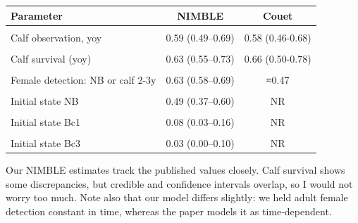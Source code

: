 \documentclass[
  12pt,
]{krantz}
\begin{document}
\begin{table}
\centering
\caption{\label{tab:dolphin}Age-specific estimates of breeding probabilities. Comparison of our NIMBLE estimates with Couet et al. (2019). 'NR' denotes quantities not reported in the paper. 'NB' is for non-breeding and 'yoy' for young-of-the-year. Adult female detection on the paper side is a rough time-average read by eye from the authors' Figure 3 (2005–2016).}
\centering
\begin{longtable}{lcc}
\toprule
Parameter & NIMBLE & Couet\\
\midrule
\cellcolor{gray!10}{Adult female survival} & \cellcolor{gray!10}{0.96 (0.94–0.98)} & \cellcolor{gray!10}{0.97 (0.96-0.98)}\\
Calf observation, yoy & 0.59 (0.49–0.69) & 0.58 (0.46-0.68)\\
\cellcolor{gray!10}{Calf observation, 1-3y} & \cellcolor{gray!10}{0.80 (0.70–0.89)} & \cellcolor{gray!10}{0.79 (0.59-0.90)}\\
Calf survival (yoy) & 0.63 (0.55–0.73) & 0.66 (0.50-0.78)\\
\cellcolor{gray!10}{Calf survival (1y)} & \cellcolor{gray!10}{0.69 (0.53–0.83)} & \cellcolor{gray!10}{0.45 (0.29-0.61)}\\
\addlinespace
Female detection: NB or calf 2-3y & 0.63 (0.58–0.69) & ≈0.47\\
\cellcolor{gray!10}{Female detection: yoy or 1-year calf} & \cellcolor{gray!10}{0.79 (0.72–0.86)} & \cellcolor{gray!10}{≈0.61}\\
Initial state NB & 0.49 (0.37–0.60) & NR\\
\cellcolor{gray!10}{Initial state Byoy} & \cellcolor{gray!10}{0.26 (0.17–0.37)} & \cellcolor{gray!10}{NR}\\
Initial state Bc1 & 0.08 (0.03–0.16) & NR\\
\addlinespace
\cellcolor{gray!10}{Initial state Bc2} & \cellcolor{gray!10}{0.14 (0.07–0.23)} & \cellcolor{gray!10}{NR}\\
Initial state Bc3 & 0.03 (0.00–0.10) & NR\\
\bottomrule
\end{longtable}
\end{table}

\justifying

Our NIMBLE estimates track the published values closely. Calf survival shows some discrepancies, but credible and confidence intervals overlap, so I would not worry too much. Note also that our model differs slightly: we held adult female detection constant in time, whereas the paper models it as time‐dependent.
\end{document}
